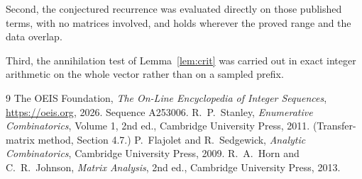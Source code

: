 \documentclass[11pt,a4paper]{article}
\theoremstyle{plain}
\theoremstyle{definition}
\begin{document}
Second, the conjectured recurrence was evaluated directly on those published terms, with no
matrices involved, and holds wherever the proved range and the data overlap.

Third, the annihilation test of Lemma~\ref{lem:crit} was carried out in exact integer
arithmetic on the whole vector rather than on a sampled prefix.

\begin{thebibliography}{9}
 The OEIS Foundation, \emph{The On-Line Encyclopedia of Integer
Sequences}, \url{https://oeis.org}, 2026. Sequence A253006.
 R.~P.~Stanley, \emph{Enumerative Combinatorics}, Volume 1, 2nd ed.,
Cambridge University Press, 2011. (Transfer-matrix method, Section 4.7.)
 P.~Flajolet and R.~Sedgewick, \emph{Analytic Combinatorics}, Cambridge
University Press, 2009.
 R.~A.~Horn and C.~R.~Johnson, \emph{Matrix Analysis}, 2nd ed., Cambridge
University Press, 2013.
\end{thebibliography}
\end{document}
